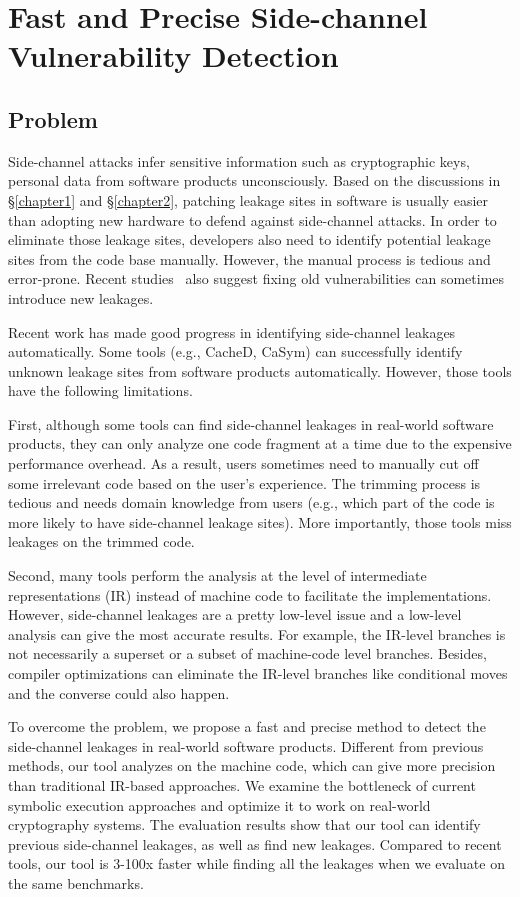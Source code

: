 
\chapter{Fast and Precise Side-channel Vulnerability Detection}\label{chapter3}
\section{Problem}
Side-channel attacks infer sensitive information such as cryptographic keys, personal data from software products unconsciously. Based on the discussions in \S\ref{chapter1} and \S\ref{chapter2}, patching leakage sites in software is usually easier than adopting new hardware to defend against side-channel attacks. In order to eliminate those leakage sites, developers also need to identify potential leakage sites from the code base manually. However, the manual process is tedious and error-prone. Recent studies~\cite{203878} also suggest fixing old vulnerabilities can sometimes introduce new leakages. 

Recent work has made good progress in identifying side-channel leakages automatically. Some tools (e.g., CacheD, CaSym) can successfully identify unknown leakage sites from software products automatically. However, those tools have the following limitations. 

First, although some tools can find side-channel leakages in real-world software products, they can only analyze one code fragment at a time due to the expensive performance overhead. As a result, users sometimes need to manually cut off some irrelevant code based on the user's experience. The trimming process is tedious and needs domain knowledge from users (e.g., which part of the code is more likely to have side-channel leakage sites). More importantly, those tools miss leakages on the trimmed code.

Second, many tools perform the analysis at the level of intermediate representations (IR) instead of machine code to facilitate the implementations. However, side-channel leakages are a pretty low-level issue and a low-level analysis can give the most accurate results. For example, the IR-level branches is not necessarily a superset or a subset of machine-code level branches. Besides, compiler optimizations can eliminate the IR-level branches like conditional moves and the converse could also happen. 

To overcome the problem, we propose a fast and precise method to detect the side-channel leakages in real-world software products. Different from previous methods, our tool analyzes on the machine code, which can give more precision than traditional IR-based approaches.  We examine the bottleneck of current symbolic execution approaches and optimize it to work on real-world cryptography systems. The evaluation results show that our tool can identify previous side-channel leakages, as well as find new leakages. Compared to recent tools, our tool is 3-100x faster while finding all the leakages when we evaluate on the same benchmarks.

